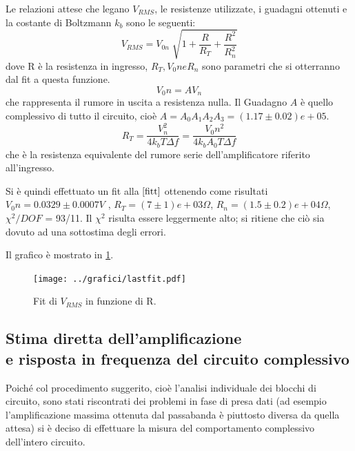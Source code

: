 \documentclass[a4paper,10pt]{article}
\begin{document}
\vspace*{-5pt}
Le relazioni attese che legano $V_{RMS}$, le resistenze utilizzate, i guadagni ottenuti e la costante di Boltzmann $k_b$ sono le seguenti:
\vspace*{-8pt}
\begin{equation}
V_{RMS} = V_{0n} \sqrt[]{1+\frac{R}{R_T}+\frac{R^2}{R_n ^2}}
\label{fitt}
\end{equation}
dove R è la resistenza in ingresso, $R_T, V_0n e R_n$ sono parametri che si otterranno dal fit a questa funzione.
\begin{equation}
V_0n = A V_n
\label{resnull}
\end{equation}
che rappresenta il rumore in uscita a resistenza nulla. Il Guadagno $A$ è quello complessivo di tutto il circuito, cioè $A = A_0 A_1 A_2 A_3 = (1.17\pm0.02)e+05 $.
\vspace*{-10pt}
\begin{equation}
R_T = \frac{V_n^2}{4k_b T \Delta f} = \frac{V_0n^2}{4k_b A_0 T \Delta f}
\label{kb}
\end{equation}
che è la resistenza equivalente del rumore serie dell'amplificatore riferito all'ingresso.

Si è quindi effettuato un fit alla $\eqref{fitt}$ ottenendo come risultati $V_0n = 0.0329\pm0.0007 V$ , $R_T = (7\pm1)e+03 \Omega $, $R_n = (1.5\pm 0.2)e+04 \Omega$, $\chi ^2 /DOF$ = 93/11. Il $\chi ^2$ risulta essere leggermente alto; si ritiene che ciò sia dovuto ad una sottostima degli errori.

Il grafico è mostrato in \cref{fig:lastfit}.
\vspace*{-10pt}
\begin{figure}[H]
	\centering
	\texttt{[image: ../grafici/lastfit.pdf]}
	\vspace*{-15pt}
	\caption{Fit di $V_{RMS}$ in funzione di R.}
	\label{fig:lastfit}
\end{figure}



\subsection{Stima diretta dell'amplificazione%
	\\e risposta in frequenza del circuito complessivo}
Poiché col procedimento suggerito, cioè l'analisi individuale dei blocchi di circuito, sono stati riscontrati dei problemi in fase di presa dati (ad esempio l'amplificazione massima ottenuta dal passabanda è piuttosto diversa da quella attesa) si è deciso di effettuare la misura del comportamento complessivo dell'intero circuito.
\end{document}
